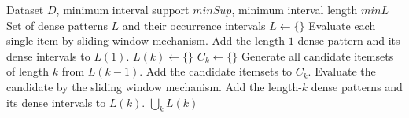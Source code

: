 \begin{algorithm}[t]
    \makeatletter
    \renewcommand{\algorithmicrequire}{\textbf{Input:}}
    \renewcommand{\algorithmicensure}{\textbf{Output:}}
    \makeatother
    \begin{algorithmic}[1]
    \caption{Main Algorithm of Apriori-window}
    \label{alg:apriori-window}
        \Require Dataset $D$, minimum interval support $minSup$, minimum interval length $minL$
        \Ensure Set of dense patterns $L$ and their occurrence intervals
        \State $L \gets \{\}$
        \State Evaluate each single item by sliding window mechanism.
        \State Add the length-$1$ dense pattern and its dense intervals to $L(1)$.
            \State $L(k) \gets \{\}$
            \State $C_k \gets \{\}$ 
            \State Generate all candidate itemsets of length $k$ from $L(k-1)$.
            \State Add the candidate itemsets to $C_k$.
                \State Evaluate the candidate by the sliding window mechanism.
                \State Add the length-$k$ dense patterns and its dense intervals to $L(k)$.
            \EndFor
        \EndFor
        \State \Return $\bigcup_k L(k)$
    \end{algorithmic}
\end{algorithm}
